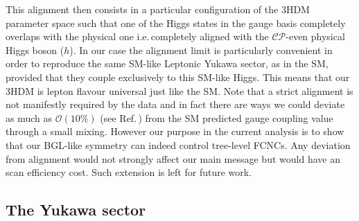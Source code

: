 \documentclass[10pt]{report}
\begin{document}
This alignment then consists in a particular configuration of the 3HDM parameter space such that one of the Higgs states in the gauge basis completely overlaps with the physical one i.e.\,completely aligned with the $\mathcal{CP}$-even physical Higgs boson ($h$). 
%
In our case the alignment limit is particularly convenient in order to reproduce the same SM-like Leptonic Yukawa sector, as in the SM, provided that they couple exclusively to this SM-like Higgs.
%
This means that our 3HDM is lepton flavour universal just like the SM. Note that a strict alignment is not manifestly required by the data and in fact there are ways we could deviate as much as $\mathcal{O}(10\%)$ (see Ref.\,\cite{Aad_2020}) from the SM predicted gauge coupling value through a small mixing. 
%
However our purpose in the current analysis is to show that our BGL-like symmetry can indeed control tree-level FCNCs. Any deviation from alignment would not strongly affect our main message but would have an scan efficiency cost. Such extension is left for future work. 


\subsection{The Yukawa sector}
\end{document}
